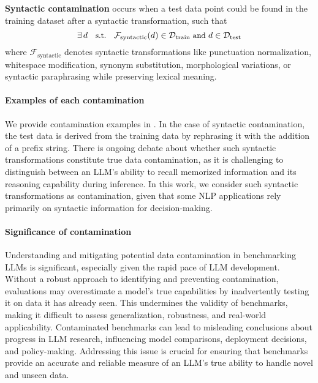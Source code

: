 \noindent \textbf{Syntactic contamination} occurs when a test data point could be found in the training dataset after  a syntactic transformation, such that
\[
\small
\exists \, d \quad \text{s.t.} \quad \mathcal{F}_{\text{syntactic}}(d) \in \mathcal{D}_{\text{train}} \text{ and } d \in \mathcal{D}_{\text{test}}
\]
where \(\mathcal{F}_{\text{syntactic}}\) denotes syntactic transformations like punctuation normalization, whitespace modification, synonym substitution, morphological variations, or syntactic paraphrasing while preserving lexical meaning.




\paragraph{Examples of each contamination}
We provide contamination examples in . In the case of syntactic contamination, the test data is derived from the training data by rephrasing it with the addition of a prefix string. There is ongoing debate about whether such syntactic transformations constitute true data contamination, as it is challenging to distinguish between an LLM’s ability to recall memorized information and its reasoning capability during inference. In this work, we consider such syntactic transformations as contamination, given that some NLP applications rely primarily on syntactic information for decision-making.




\paragraph{Significance of contamination} Understanding and mitigating potential data contamination in benchmarking LLMs is significant, especially given the rapid pace of LLM development. Without a robust approach to identifying and preventing contamination, evaluations may overestimate a model’s true capabilities by inadvertently testing it on data it has already seen. This undermines the validity of benchmarks, making it difficult to assess generalization, robustness, and real-world applicability. Contaminated benchmarks can lead to misleading conclusions about progress in LLM research, influencing model comparisons, deployment decisions, and policy-making. Addressing this issue is crucial for ensuring that benchmarks provide an accurate and reliable measure of an LLM’s true ability to handle novel and unseen data.






